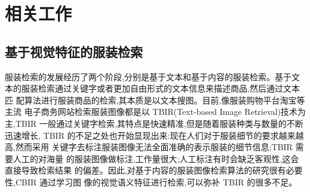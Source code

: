 \chapter{相关工作}



\section{基于视觉特征的服装检索}

服装检索的发展经历了两个阶段,分别是基于文本和基于内容的服装检索。基于文
本的服装检索通过关键字或者更加自由形式的文本信息来描述商品,然后通过文本匹
配算法进行服装商品的检索,其本质是以文本搜图。目前,像服装购物平台淘宝等主流
电子商务网站检索服装图像都是以 TBIR(Text-based Image Retrieval)技术为主,TBIR
一般通过关键字检索,其特点是快速精准,但是随着服装种类与数量的不断迅速增长,
TBIR 的不足之处也开始显现出来:现在人们对于服装细节的要求越来越高,然而采用
关键字去标注服装图像无法全面准确的表示服装的细节信息;TBIR 需要人工的对海量
的服装图像做标注,工作量很大;人工标注有时会缺乏客观性,这会直接导致检索结果
的偏差。因此,对基于内容的服装图像检索算法的研究很有必要性,CBIR 通过学习图
像的视觉语义特征进行检索,可以弥补 TBIR 的很多不足。

